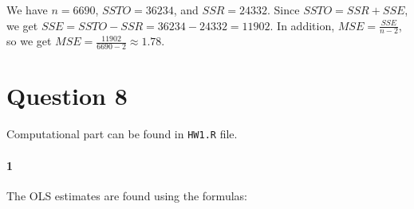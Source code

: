 \documentclass[]{article}
\let\oldparagraph\paragraph
\renewcommand{\paragraph}[1]{\oldparagraph{#1}\mbox{}}
\begin{document}
We have $n = 6690$, $SSTO = 36234$, and $SSR = 24332$. Since $SSTO = SSR + SSE$, we get $SSE = SSTO - SSR = 36234 - 24332 = 11902$. In addition, $MSE = \frac{SSE}{n - 2}$, so we get $MSE = \frac{11902}{6690 - 2} \approx 1.78$.

\section*{Question 8}












Computational part can be found in \texttt{HW1.R} file.

\paragraph{1}
The OLS estimates are found using the formulas:
\end{document}
